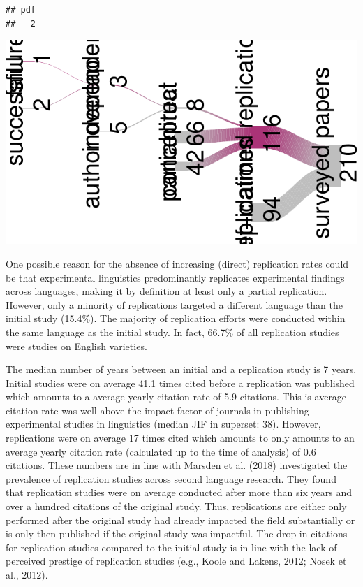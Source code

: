 \documentclass[]{elsarticle} %
\begin{document}
\begin{verbatim}
## pdf 
##   2
\end{verbatim}

\includegraphics{ReplicationLing_files/figure-latex/river plot-1.pdf}

One possible reason for the absence of increasing (direct) replication
rates could be that experimental linguistics predominantly replicates
experimental findings across languages, making it by definition at least
only a partial replication. However, only a minority of replications
targeted a different language than the initial study (15.4\%). The
majority of replication efforts were conducted within the same language
as the initial study. In fact, 66.7\% of all replication studies were
studies on English varieties.

The median number of years between an initial and a replication study is
7 years. Initial studies were on average 41.1 times cited before a
replication was published which amounts to a average yearly citation
rate of 5.9 citations. This is average citation rate was well above the
impact factor of journals in publishing experimental studies in
linguistics (median JIF in superset: 38). However, replications were on
average 17 times cited which amounts to only amounts to an average
yearly citation rate (calculated up to the time of analysis) of 0.6
citations. These numbers are in line with Marsden et al. (2018)
investigated the prevalence of replication studies across second
language research. They found that replication studies were on average
conducted after more than six years and over a hundred citations of the
original study. Thus, replications are either only performed after the
original study had already impacted the field substantially or is only
then published if the original study was impactful. The drop in
citations for replication studies compared to the initial study is in
line with the lack of perceived prestige of replication studies (e.g.,
Koole and Lakens, 2012; Nosek et al., 2012).
\end{document}
